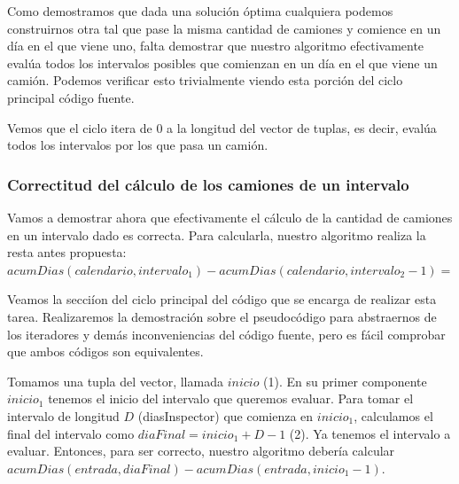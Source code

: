  \vspace{2mm}

 Como demostramos que dada una soluci\'on \'optima cualquiera podemos construirnos otra tal que pase la misma cantidad de camiones y comience en un d\'ia en el que viene uno, falta demostrar que nuestro algoritmo efectivamente eval\'ua todos los intervalos posibles que comienzan en un d\'ia en el que viene un cami\'on. Podemos verificar esto trivialmente viendo esta porci\'on del ciclo principal c\'odigo fuente.

 

  \vspace{2mm}

  Vemos que el ciclo itera de 0 a la longitud del vector de tuplas, es decir, eval\'ua todos los intervalos por los que pasa un cami\'on. 


\vspace{4mm}

\subsubsection{Correctitud del c\'alculo de los camiones de un intervalo}

Vamos a demostrar ahora que efectivamente el c\'alculo de la cantidad de camiones en un intervalo dado es correcta. Para calcularla, nuestro algoritmo realiza la resta antes propuesta: $acumDias(calendario, intervalo_1) - acumDias(calendario, intervalo_2 -1) = $

\vspace{4mm}

 Veamos la secci\'ion del ciclo principal del c\'odigo que se encarga de realizar esta tarea. Realizaremos la demostraci\'on sobre el pseudoc\'odigo para abstraernos de los iteradores y dem\'as inconveniencias del c\'odigo fuente, pero es f\'acil comprobar que ambos c\'odigos son equivalentes. 
 \vspace{2mm}



	 \vspace{2mm}

Tomamos una tupla del vector, llamada $inicio$ (1). En su primer componente $inicio_1$ tenemos el inicio del intervalo que queremos evaluar. Para tomar el intervalo de longitud $D$ (diasInspector) que comienza en $inicio_1$, calculamos el final del intervalo como $ diaFinal = inicio_1 + D - 1$ (2). Ya tenemos el intervalo a evaluar. Entonces, para ser correcto, nuestro algoritmo deber\'ia calcular $acumDias(entrada,  diaFinal) - acumDias(entrada, inicio_1 -1)$.

